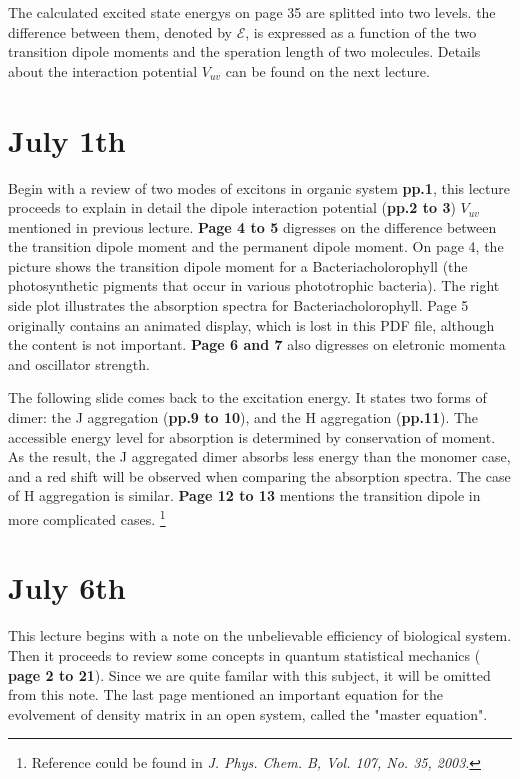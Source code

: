 \documentclass{article}
\numberwithin{equation}{subsection} %
\theoremstyle{definition}
\begin{document}
The calculated excited state energys on page 35 are splitted into
two levels. the difference between them, denoted by $\mathcal{E}$,
is expressed as a function of the two
transition dipole moments and the speration length of two molecules.
Details about the interaction potential $V_{uv}$ can be found on
the next lecture.

\section{July 1th}
\label{sec:July_1th}
Begin with a review of two modes of excitons in organic system
\textbf{pp.1}, this
lecture proceeds to explain in detail the dipole interaction potential
(\textbf{pp.2 to 3})
$V_{uv}$ mentioned in previous lecture. \textbf{Page 4 to 5} digresses on
the difference between the transition dipole moment and the
permanent dipole moment. On page 4, the picture shows the transition dipole
moment for a Bacteriacholorophyll (the photosynthetic pigments that 
occur in various phototrophic bacteria). The right side plot illustrates
the absorption spectra for Bacteriacholorophyll. Page 5 originally
contains an animated display, which is lost in this PDF file, although
the content is not important.
\textbf{Page 6 and 7} also digresses on eletronic momenta and oscillator
strength. 

The following slide comes back to the excitation energy. It states two
forms of dimer: the J aggregation (\textbf{pp.9 to 10}), and the H
aggregation (\textbf{pp.11}). The accessible energy level for absorption
is determined by conservation of moment. As the result, the J aggregated
dimer absorbs less energy than the monomer case, and a red shift will be
observed when comparing the absorption spectra. The case of H aggregation
is similar. \textbf{Page 12 to 13 } mentions the transition dipole in
more complicated cases. \footnote{Reference could be found in \textit{
J. Phys. Chem. B, Vol. 107, No. 35, 2003}.}

\section{July 6th}
\label{sec:July_6th}
This lecture begins with a note on the unbelievable efficiency of biological
system. Then it proceeds to review some concepts in quantum statistical 
mechanics ( \textbf{page 2 to 21}). Since we are quite familar with this
subject, it will be omitted from this note. The last page mentioned an
important equation for the evolvement of density matrix in an open system,
called the "master equation".
\end{document}
